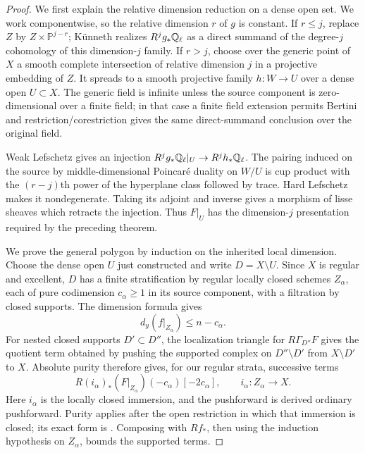 \begin{proof}
We first explain the relative dimension reduction on a dense open set. We work componentwise, so the relative dimension $r$ of $g$ is constant. If $r\leq j$, replace $Z$ by $Z\times\mathbb P^{j-r}$; K\"unneth realizes $R^jg_*\mathbb Q_\ell$ as a direct summand of the degree-$j$ cohomology of this dimension-$j$ family. If $r>j$, choose over the generic point of $X$ a smooth complete intersection of relative dimension $j$ in a projective embedding of $Z$. It spreads to a smooth projective family $h:W\to U$ over a dense open $U\subset X$. The generic field is infinite unless the source component is zero-dimensional over a finite field; in that case a finite field extension permits Bertini and restriction/corestriction gives the same direct-summand conclusion over the original field.

Weak Lefschetz gives an injection $R^jg_*\mathbb Q_\ell|_U\to R^jh_*\mathbb Q_\ell$. The pairing induced on the source by middle-dimensional Poincar\'e duality on $W/U$ is cup product with the $(r-j)$th power of the hyperplane class followed by trace. Hard Lefschetz makes it nondegenerate. Taking its adjoint and inverse gives a morphism of lisse sheaves which retracts the injection. Thus $F|_U$ has the dimension-$j$ presentation required by the preceding theorem.

We prove the general polygon by induction on the inherited local dimension. Choose the dense open $U$ just constructed and write $D=X\setminus U$. Since $X$ is regular and excellent, $D$ has a finite stratification by regular locally closed schemes $Z_\alpha$, each of pure codimension $c_\alpha\geq1$ in its source component, with a filtration by closed supports. The dimension formula gives
\[
 d_y(f|_{Z_\alpha})\leq n-c_\alpha.
\]
For nested closed supports $D'\subset D''$, the localization triangle for $R\Gamma_{D''}F$ gives the quotient term obtained by pushing the supported complex on $D''\setminus D'$ from $X\setminus D'$ to $X$. Absolute purity therefore gives, for our regular strata, successive terms
\[
 R(i_\alpha)_*(F|_{Z_\alpha})(-c_\alpha)[-2c_\alpha],
 \qquad i_\alpha:Z_\alpha\longrightarrow X.
\]
Here $i_\alpha$ is the locally closed immersion, and the pushforward is derived ordinary pushforward. Purity applies after the open restriction in which that immersion is closed; its exact form is \citet[Corollary 3.1.2]{c_riou2014}. Composing with $Rf_*$, then using the induction hypothesis on $Z_\alpha$, bounds the supported terms.


\end{proof}
